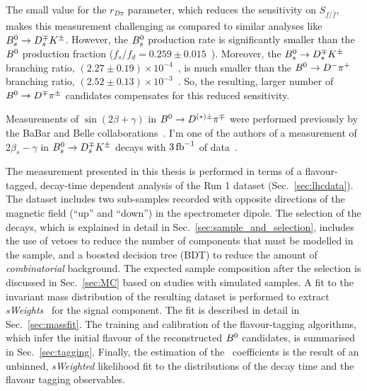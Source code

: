 The small value for the $r_{D\pi}$ parameter, which reduces the sensitivity on $S_{f/\bar f}$, makes this measurement challenging 
as compared to similar analyses like $B^0_s\rightarrow D^{\mp}_sK^\pm$. 
However, the $B^0_s$ production rate is significantly smaller 
than the $B^0$ production fraction ($f_s/f_d=0.259\pm0.015$~\cite{LHCb:2013lka}). 
Moreover, the $B^0_s\rightarrow D^{\mp}_sK^\pm$ branching ratio, $(2.27\pm0.19)\times 10^{-4}$~\cite{Louvot:2008sc}, is much smaller than 
the $B^0\rightarrow D^-\pi^+$ branching ratio, $(2.52\pm0.13)\times 10^{-3}$~\cite{PDG2017}.  
So, the resulting, larger number of $B^0\rightarrow D^\mp\pi^\pm$ candidates compensates for this reduced sensitivity.

Measurements of $\sin(2\beta+\gamma)$ in $B^0\rightarrow D^{(*)\pm}\pi^\mp$ were performed previously
by the BaBar and Belle collaborations~\cite{Aubert:2006tw,Aubert:2005yf,Bahinipati:2011yq,PhysRevD.73.092003}.
I'm one of the authors of a measurement of $2\beta_s - \gamma$ in $B^0_s\rightarrow D^{\mp}_sK^\pm$ decays with $3\mbox{\,fb}^{-1}$ of data~\cite{LHCb-PAPER-2017-047}.

The measurement presented in this thesis is performed in terms of a flavour-tagged, decay-time dependent
analysis of the Run 1 dataset (Sec.~\ref{sec:lhcdata}). The dataset includes two sub-samples recorded with opposite
directions of the magnetic field (``up'' and ``down'') in the spectrometer dipole.
The selection of the decays, which is explained in detail in Sec.~\ref{sec:sample_and_selection}, includes
the use of vetoes to reduce the number of components that must be modelled in the sample, and
a boosted decision tree (BDT) to reduce the amount of \emph{combinatorial} background. The expected sample
composition after the selection is discussed in Sec.~\ref{sec:MC} based on
studies with simulated samples. A fit to the invariant mass distribution of the
resulting dataset is performed to extract \emph{sWeights}~\cite{Pivk:2004ty} for the signal component. The
fit is described in detail in Sec.~\ref{sec:massfit}. The training and
calibration of the flavour-tagging algorithms, which infer the initial flavour
of the reconstructed $B^0$ candidates, is summarised in
Sec.~\ref{sec:tagging}. Finally, the estimation of the \CP~coefficients is
the result of an unbinned, \emph{sWeighted} likelihood fit to the distributions of the
decay time and the flavour tagging observables. 
